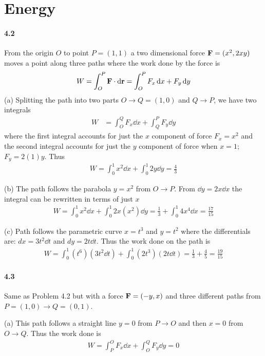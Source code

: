 \documentclass[../problems.tex]{subfiles}
\begin{document}
\section{Energy}
\barh

\paragraph{4.2}
From the origin $O$ to point $P = (1,1)$ a two dimensional force $\vb{F} = (x^2, 2xy)$ 
moves a point along three paths where the work done by the force is 
\begin{equation*}
    W = \int_O^P \vb{F} \cdot \dd{\vb{r}} = \int_O^P F_x \dd{x} + F_y \dd{y}
\end{equation*}
(a) Splitting the path into two parts $O \to Q=(1,0)$ and $Q \to P$, we have two integrals
\begin{align*}
    W &= \int_O^Q F_x \dd{x} + \int_Q^P F_y \dd{y}
\end{align*}
where the first integral accounts for just the $x$ component of force $F_x = x^2$ and the second
integral accounts for just the $y$ component of force when $x=1$; $F_y = 2(1)y$. Thus
\begin{align*}
    W = \int_0^1 x^2 \dd{x} + \int_0^1 2y \dd{y} = \frac{4}{3}
\end{align*}

(b) The path follows the parabola $y=x^2$ from $O \to P$. From $\dd{y} = 2x \dd{x}$ the integral
can be rewritten in terms of just $x$
\begin{align*}
    W = \int_0^1 x^2 \dd{x} + \int_0^1 2x (x^2) \dd{y} 
    = \frac{1}{3} + \int_0^1 4x^4 \dd{x} = \frac{17}{15}
\end{align*}

(c) Path follows the parametric curve $x=t^3$ and $y=t^2$ where the differentials are:
$dx = 3t^2 \dd{t}$ and $dy = 2t \dd{t}$. Thus the work done on the path is
\begin{align*}
    W = \int_0^1 (t^6) (3t^2 \dd{t}) + \int_0^1 (2t^3) (2t \dd{t}) 
    = \frac{1}{3} + \frac{4}{5} = \frac{19}{15}
\end{align*}

\paragraph{4.3}
Same as Problem 4.2 but with a force $\vb{F} = (-y,x)$ and three different paths from $P = (1,0) \to
Q = (0,1)$.

(a) This path follows a straight line $y = 0$ from $P \to O$ and then $x = 0$ from $O \to Q$. Thus 
the work done is 
\begin{align*}
    W = \int_P^O F_x \dd{x} + \int_O^Q F_y \dd{y} = 0
\end{align*}
\end{document}
